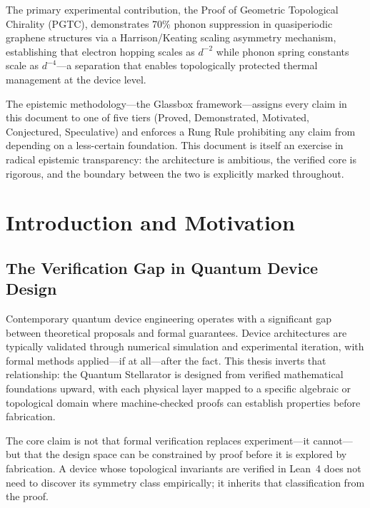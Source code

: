 \documentclass[12pt,letterpaper]{report}
\begin{document}
The primary experimental contribution, the Proof of Geometric Topological Chirality (PGTC), demonstrates 70\% phonon suppression in quasiperiodic graphene structures via a Harrison/Keating scaling asymmetry mechanism, establishing that electron hopping scales as $d^{-2}$ while phonon spring constants scale as $d^{-4}$---a separation that enables topologically protected thermal management at the device level.

The epistemic methodology---the Glassbox framework---assigns every claim in this document to one of five tiers (Proved, Demonstrated, Motivated, Conjectured, Speculative) and enforces a Rung Rule prohibiting any claim from depending on a less-certain foundation. This document is itself an exercise in radical epistemic transparency: the architecture is ambitious, the verified core is rigorous, and the boundary between the two is explicitly marked throughout.



\chapter{Introduction and Motivation}

\section{The Verification Gap in Quantum Device Design}

Contemporary quantum device engineering operates with a significant gap between theoretical proposals and formal guarantees. Device architectures are typically validated through numerical simulation and experimental iteration, with formal methods applied---if at all---after the fact. This thesis inverts that relationship: the Quantum Stellarator is designed from verified mathematical foundations upward, with each physical layer mapped to a specific algebraic or topological domain where machine-checked proofs can establish properties before fabrication.

The core claim is not that formal verification replaces experiment---it cannot---but that the design space can be constrained by proof before it is explored by fabrication. A device whose topological invariants are verified in Lean~4 does not need to discover its symmetry class empirically; it inherits that classification from the proof.
\end{document}
